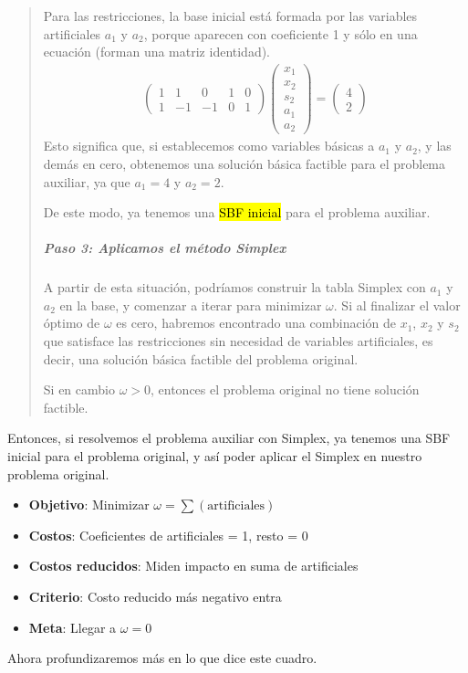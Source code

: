 \begin{quote}
  Para las restricciones, la base inicial está formada por las variables artificiales \(a_1\) y \(a_2\), porque aparecen con coeficiente 1 y sólo en una ecuación (forman una matriz identidad).
  \begin{align*}
    \begin{pmatrix}
      1 & 1 & 0 & 1 & 0\\
      1 & -1 & -1 & 0 & 1
    \end{pmatrix}
    \begin{pmatrix}
      x_1\\
      x_2\\
      s_2\\
      a_1\\
      a_2
    \end{pmatrix}
    =
    \begin{pmatrix}
      4\\
      2
    \end{pmatrix}
  \end{align*}
  Esto significa que, si establecemos como variables básicas a \(a_1\) y \(a_2\), y las demás en cero, obtenemos una solución básica factible para el problema auxiliar, ya que \(a_1 = 4\) y \(a_2 = 2\).

  De este modo, ya tenemos una \hl{SBF inicial} para el problema auxiliar.
  
  \subparagraph{Paso 3: Aplicamos el método Simplex}
  
  A partir de esta situación, podríamos construir la tabla Simplex con \(a_1\) y \(a_2\) en la base, y comenzar a iterar para minimizar \(\omega\). Si al finalizar el valor óptimo de \(\omega\) es cero, habremos encontrado una combinación de \(x_1\), \(x_2\) y \(s_2\) que satisface las restricciones sin necesidad de variables artificiales, es decir, una solución básica factible del problema original.
  
  Si en cambio \(\omega > 0\), entonces el problema original no tiene solución factible.  
\end{quote}

Entonces, si resolvemos el problema auxiliar con Simplex, ya tenemos una SBF inicial para el problema original, y así poder aplicar el Simplex en nuestro problema original.

\begin{tcolorbox}[interesting_data, title=Siempre recordar lo que se busca en la Fase I]
  \begin{itemize}
    \item \textbf{Objetivo}: Minimizar \(\omega = \sum(\text{artificiales})\)
    \item \textbf{Costos}: Coeficientes de artificiales = 1, resto = 0
    \item \textbf{Costos reducidos}: Miden impacto en suma de artificiales
    \item \textbf{Criterio}: Costo reducido más negativo entra
    \item \textbf{Meta}: Llegar a \(\omega = 0\)
  \end{itemize}
\end{tcolorbox}
Ahora profundizaremos más en lo que dice este cuadro.

